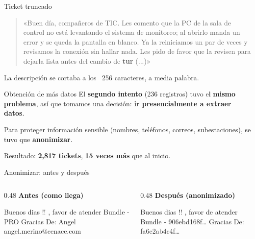 \documentclass[xcolor=dvipsnames]{beamer}
\begin{document}
\begin{frame}{Ticket truncado}
    \begin{quote}
        «Buen día, compañeros de TIC. Les comento que la PC de la sala de control no
        está levantando el sistema de monitoreo; al abrirlo manda un error y se queda
        la pantalla en blanco. Ya la reiniciamos un par de veces y revisamos la conexión
        sin hallar nada. Les pido de favor que la revisen para dejarla lista antes del
        cambio de \textbf{tur} (...)»
    \end{quote}
    \vspace{0.5em}
    {\small La descripción se cortaba a los ~256 caracteres, a media palabra.}
\end{frame}

\begin{frame}{Obtención de más datos}
    El \textbf{segundo intento} (236 registros) tuvo el \textbf{mismo problema}, así que
    tomamos una decisión: \textbf{ir presencialmente a extraer datos}.

    \bigskip
    Para proteger información sensible (nombres, teléfonos, correos,
    subestaciones), se tuvo que \textbf{anonimizar}.

    \bigskip
    Resultado: \textbf{2,817 tickets}, \textbf{15 veces más} que al inicio.
\end{frame}


\begin{frame}{Anonimizar: antes y después}
    \begin{columns}[t]
        \begin{column}{0.48\textwidth}
            \textbf{Antes (como llega)}
            \medskip

            \flqq Buenos dias !! , favor de atender Bundle - \textcolor{red!65!black}{PRO} Gracias De: \textcolor{red!65!black}{Angel} \textcolor{red!65!black}{angel.merino@cenace.com}\frqq
        
        \end{column}
        \begin{column}{0.48\textwidth}
            \textbf{Después (anonimizado)}
            \medskip

            \flqq Buenos dias !! , favor de atender Bundle - \textcolor{orange!80!black}{906ebd168f\dots} Gracias De: \textcolor{orange!80!black}{fa6e2ab4c4f\dots}\frqq

        \end{column}
    \end{columns}
\end{frame}
\end{document}
